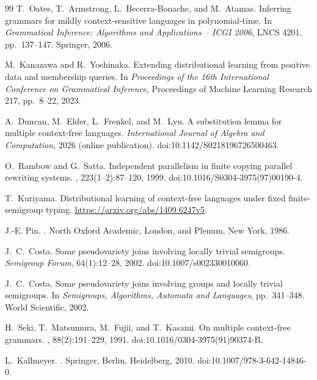 \documentclass[11pt]{article}
\numberwithin{equation}{section}
\theoremstyle{plain}
\theoremstyle{definition}
\theoremstyle{remark}
\begin{document}
\begin{thebibliography}{99}
T.~Oates, T.~Armstrong, L.~Becerra-Bonache, and M.~Atamas.
\newblock Inferring grammars for mildly context-sensitive languages in polynomial-time.
\newblock In {\em Grammatical Inference: Algorithms and Applications -- ICGI 2006},
LNCS 4201, pp.~137--147. Springer, 2006.

M.~Kanazawa and R.~Yoshinaka.
\newblock Extending distributional learning from positive data and membership queries.
\newblock In {\em Proceedings of the 16th International Conference on Grammatical Inference},
Proceedings of Machine Learning Research 217, pp.~8--22, 2023.

A.~Duncan, M.~Elder, L.~Frenkel, and M.~Lyu.
\newblock A substitution lemma for multiple context-free languages.
\newblock \emph{International Journal of Algebra and Computation},
2026 (online publication).
\newblock doi:10.1142/S0218196726500463.

O.~Rambow and G.~Satta.
\newblock Independent parallelism in finite copying parallel rewriting systems.
, 223(1--2):87--120, 1999.
\newblock doi:10.1016/S0304-3975(97)00190-4.

T.~Kuriyama.
\newblock Distributional learning of context-free languages under fixed
finite-semigroup typing.
\newblock \url{https://arxiv.org/abs/1409.6247v5}.

J.-E. Pin.
.
\newblock North Oxford Academic, London, and Plenum, New York, 1986.

J.~C.~Costa.
\newblock Some pseudovariety joins involving locally trivial semigroups.
\newblock \emph{Semigroup Forum}, 64(1):12--28, 2002.
\newblock doi:10.1007/s002330010060.

J.~C.~Costa.
\newblock Some pseudovariety joins involving groups and locally trivial semigroups.
\newblock In \emph{Semigroups, Algorithms, Automata and Languages},
pp.~341--348. World Scientific, 2002.

H.~Seki, T.~Matsumura, M.~Fujii, and T.~Kasami.
\newblock On multiple context-free grammars.
, 88(2):191--229, 1991.
\newblock doi:10.1016/0304-3975(91)90374-B.

L.~Kallmeyer.
.
\newblock Springer, Berlin, Heidelberg, 2010.
\newblock doi:10.1007/978-3-642-14846-0.


\end{thebibliography}
\end{document}
